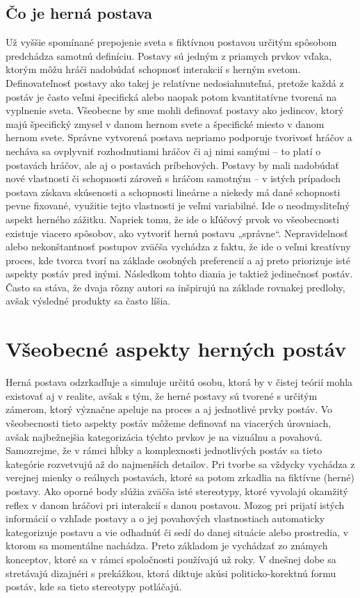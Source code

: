 \documentclass[10pt,twoside,slovak,a4paper]{article}
\begin{document}
\subsection{Čo je herná postava}\label{2.0:2.1}
Už vyššie spomínané prepojenie sveta s fiktívnou postavou určitým spôsobom predchádza samotnú definíciu. Postavy sú jedným z priamych prvkov vďaka, ktorým môžu hráči nadobúdať schopnosť interakcií s herným svetom. Definovateľnosť postavy ako takej je relatívne nedosiahnuteľná, pretože každá z postáv je často veľmi špecifická alebo naopak potom kvantitatívne tvorená na vyplnenie sveta. Všeobecne by sme mohli definovať postavy ako jedincov, ktorý majú špecifický zmysel v danom hernom svete a špecifické miesto v danom hernom svete. Správne vytvorená postava nepriamo podporuje tvorivosť hráčov a necháva sa ovplyvniť rozhodnutiami hráčov či aj nimi samými – to platí o postavách hráčov, ale aj o postavách príbehových. Postavy by mali nadobúdať nové vlastnosti či schopnosti zároveň s hráčom samotným – v istých prípadoch postava získava skúsenosti a schopnosti lineárne a niekedy má dané schopnosti pevne fixované, využitie tejto vlastnosti je veľmi variabilné.  Ide o neodmysliteľný aspekt herného zážitku. Napriek tomu, že ide o kľúčový prvok vo všeobecnosti existuje viacero spôsobov, ako vytvoriť hernú postavu „správne“. Nepravidelnosť alebo nekonštantnosť postupov zväčša vychádza z faktu, že ide o veľmi kreatívny proces, kde tvorca tvorí na základe osobných preferencií a aj preto priorizuje isté aspekty postáv pred inými. Následkom tohto diania je taktiež jedinečnosť postáv. Často sa stáva, že dvaja rôzny autori sa inšpirujú na základe rovnakej predlohy, avšak výsledné produkty sa často líšia.

\section{Všeobecné aspekty herných postáv} \label{3.0}
Herná postava odzrkadľuje a simuluje určitú osobu, ktorá by v čistej teórií mohla existovať aj v realite, avšak s tým, že herné postavy sú tvorené s určitým zámerom, ktorý význačne apeluje na proces a aj jednotlivé prvky postáv. Vo všeobecnosti tieto aspekty postáv môžeme definovať na viacerých úrovniach, avšak najbežnejšia kategorizácia týchto prvkov je na vizuálnu a povahovú. Samozrejme, že v rámci hĺbky a komplexnosti jednotlivých postáv sa tieto kategórie rozvetvujú až do najmenších detailov. Pri tvorbe sa vždycky vychádza z verejnej mienky o reálnych postavách, ktoré sa potom zrkadlia na fiktívne (herné) postavy. Ako oporné body slúžia zväčša isté stereotypy, ktoré vyvolajú okamžitý reflex v danom hráčovi pri interakcií s danou postavou. Mozog pri prijatí istých informácií o vzhľade postavy a o jej povahových vlastnostiach automaticky kategorizuje postavu a vie odhadnúť  či sedí do danej situácie alebo prostredia, v ktorom sa momentálne nachádza.  Preto základom je vychádzať zo známych konceptov, ktoré sa v rámci spoločnosti používajú už roky. V dnešnej dobe sa stretávajú dizajnéri s prekážkou, ktorá diktuje akúsi politicko-korektnú formu postáv, kde sa tieto stereotypy potláčajú. \cite{CharacterDesign:MPD}
\end{document}
